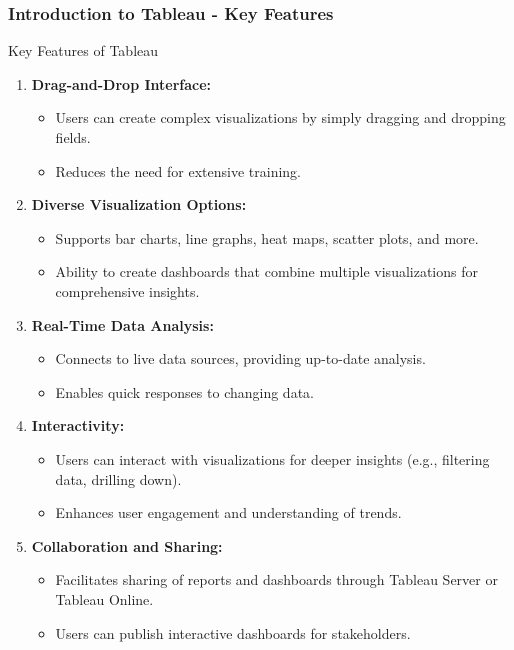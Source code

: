 \documentclass[aspectratio=169]{beamer}
\begin{document}
\begin{frame}[fragile]
    \frametitle{Introduction to Tableau - Key Features}
    \begin{block}{Key Features of Tableau}
        \begin{enumerate}
            \item \textbf{Drag-and-Drop Interface:}
                \begin{itemize}
                    \item Users can create complex visualizations by simply dragging and dropping fields.
                    \item Reduces the need for extensive training.
                \end{itemize}
            \item \textbf{Diverse Visualization Options:}
                \begin{itemize}
                    \item Supports bar charts, line graphs, heat maps, scatter plots, and more.
                    \item Ability to create dashboards that combine multiple visualizations for comprehensive insights.
                \end{itemize}
            \item \textbf{Real-Time Data Analysis:}
                \begin{itemize}
                    \item Connects to live data sources, providing up-to-date analysis.
                    \item Enables quick responses to changing data.
                \end{itemize}
            \item \textbf{Interactivity:}
                \begin{itemize}
                    \item Users can interact with visualizations for deeper insights (e.g., filtering data, drilling down).
                    \item Enhances user engagement and understanding of trends.
                \end{itemize}
            \item \textbf{Collaboration and Sharing:}
                \begin{itemize}
                    \item Facilitates sharing of reports and dashboards through Tableau Server or Tableau Online.
                    \item Users can publish interactive dashboards for stakeholders.
                \end{itemize}
        \end{enumerate}
    \end{block}
\end{frame}
\end{document}
